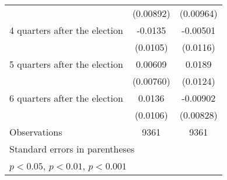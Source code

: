 \begin{table}[htbp]
\begin{tabular}{l*{2}{c}}
                    &   (0.00892)         &   (0.00964)         \\
[1em]
 4 quarters after the election&     -0.0135         &    -0.00501         \\
                    &    (0.0105)         &    (0.0116)         \\
[1em]
 5 quarters after the election&     0.00609         &      0.0189         \\
                    &   (0.00760)         &    (0.0124)         \\
[1em]
 6 quarters after the election&      0.0136         &    -0.00902         \\
                    &    (0.0106)         &   (0.00828)         \\
\hline
Observations        &        9361         &        9361         \\
\hline\hline
\multicolumn{3}{l}{\footnotesize Standard errors in parentheses}\\
\multicolumn{3}{l}{\footnotesize \sym{*} \(p<0.05\), \sym{**} \(p<0.01\), \sym{***} \(p<0.001\)}\\
\end{tabular}
\end{table}
